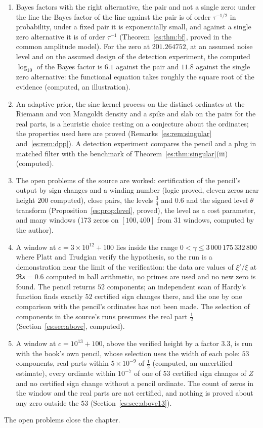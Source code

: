 \begin{enumerate}
\item Bayes factors with the right alternative, the pair and not a single zero: under the line the Bayes factor of the line against the pair is of order $\tau^{-1/2}$ in probability, under a fixed pair it is exponentially small, and against a single zero alternative it is of order $\tau^{-1}$ (Theorem~\ref{es:thm:bf}, proved in the common amplitude model). For the zero at $201.264752$, at an assumed noise level and on the assumed design of the detection experiment, the computed $\log_{10}$ of the Bayes factor is $6.1$ against the pair and $11.8$ against the single zero alternative: the functional equation takes roughly the square root of the evidence (computed, an illustration).
\item An adaptive prior, the sine kernel process on the distinct ordinates at the Riemann and von Mangoldt density and a spike and slab on the pairs for the real parts, is a heuristic choice resting on a conjecture about the ordinates; the properties used here are proved (Remarks~\ref{es:rem:singular} and~\ref{es:rem:dpp}). A detection experiment compares the pencil and a plug in matched filter with the benchmark of Theorem~\ref{es:thm:singular}(iii) (computed).
\item The open problems of the source are worked: certification of the pencil's output by sign changes and a winding number (logic proved, eleven zeros near height $200$ computed), close pairs, the levels $\tfrac34$ and $0.6$ and the signed level $\theta$ transform (Proposition~\ref{es:prop:level}, proved), the level as a cost parameter, and many windows (173 zeros on $[100,400]$ from 31 windows, computed by the author).
\item A window at $c=3\times10^{12}+100$ lies inside the range $0<\gamma\le3\,000\,175\,332\,800$ where Platt and Trudgian \cite{PT21} verify the hypothesis, so the run is a demonstration near the limit of the verification: the data are values of $\xi'/\xi$ at $\Re s=0.6$ computed in ball arithmetic, no primes are used and no new zero is found. The pencil returns $52$ components; an independent scan of Hardy's function finds exactly $52$ certified sign changes there, and the one by one comparison with the pencil's ordinates has not been made. The selection of components in the source's runs presumes the real part $\tfrac12$ (Section~\ref{es:sec:above}, computed).
\item A window at $c=10^{13}+100$, above the verified height by a factor $3.3$, is run with the book's own pencil, whose selection uses the width of each pole: $53$ components, real parts within $5\times10^{-9}$ of $\tfrac12$ (computed, an uncertified estimate), every ordinate within $10^{-7}$ of one of $53$ certified sign changes of $Z$ and no certified sign change without a pencil ordinate. The count of zeros in the window and the real parts are not certified, and nothing is proved about any zero outside the $53$ (Section~\ref{es:sec:above13}).
\end{enumerate}
The open problems close the chapter.
